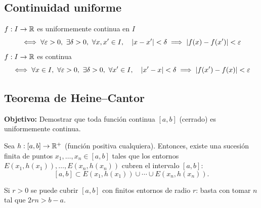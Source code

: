 \documentclass[11pt,a4paper]{article}
\begin{document}

\subsection{Continuidad uniforme}

$f:I\to\mathbb{R}$ es uniformemente continua en $I$
\[
  \iff \forall\varepsilon>0,\ \exists\delta>0,\ \forall x,x'\in I,\quad \abs{x-x'}<\delta\implies\abs{f(x)-f(x')}<\varepsilon
\]
$f:I\to\mathbb{R}$ es continua
\[
  \iff \forall x\in I,\ \forall\varepsilon>0,\ \exists\delta>0,\ \forall x'\in I,\quad \abs{x'-x}<\delta\implies\abs{f(x')-f(x)}<\varepsilon
\]

\subsection{Teorema de Heine--Cantor}

\textbf{Objetivo:} Demostrar que toda función continua $[a,b]$ (cerrado) es uniformemente continua.

\begin{lema}
Sea $h:[a,b]\to\mathbb{R}^+$ (función positiva cualquiera). Entonces, existe una sucesión finita de puntos $x_1,\dots,x_n\in[a,b]$ tales que los entornos $E(x_1,h(x_1)),\dots,E(x_n,h(x_n))$ cubren el intervalo $[a,b]$:
\[
  [a,b]\subset E(x_1,h(x_1))\cup\cdots\cup E(x_n,h(x_n)).
\]
\end{lema}

\begin{observacion}
Si $r>0$ se puede cubrir $[a,b]$ con finitos entornos de radio $r$: basta con tomar $n$ tal que $2rn>b-a$.
\end{observacion}
\end{document}
